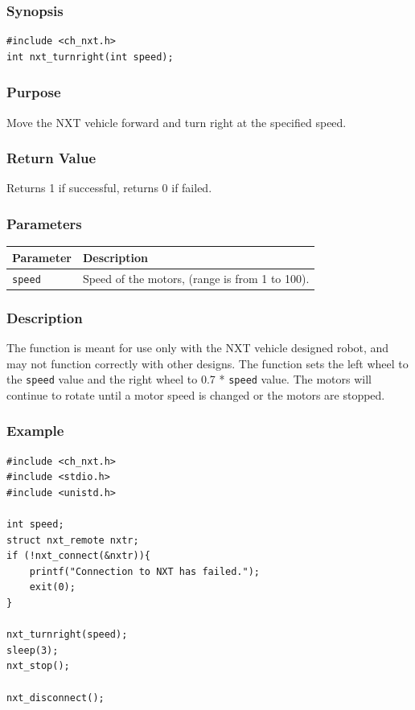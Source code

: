 \documentclass[12pt]{article}
\begin{document}
\subsubsection*{Synopsis}
\begin{verbatim}
#include <ch_nxt.h>
int nxt_turnright(int speed);
\end{verbatim}

\subsubsection*{Purpose}
Move the NXT vehicle forward and turn right at the specified speed.

\subsubsection*{Return Value}
Returns 1 if successful, returns 0 if failed.

\subsubsection*{Parameters}
\begin{tabular}{ l | p{12cm} }
Parameter			& Description\\ \hline
\verb+speed+	    & Speed of the motors, (range is from 1 to 100).
\end{tabular}

\subsubsection*{Description}
The function is meant for use only with the NXT vehicle designed robot, 
and may not function correctly with other designs. The function sets the 
left wheel to the \verb+speed+ value and the right wheel to 0.7 * 
\verb+speed+ value. The motors will continue to rotate until a motor speed 
is changed or the motors are stopped.


\subsubsection*{Example}
\begin{verbatim}
#include <ch_nxt.h> 
#include <stdio.h>
#include <unistd.h>

int speed;
struct nxt_remote nxtr;
if (!nxt_connect(&nxtr)){
    printf("Connection to NXT has failed.");
    exit(0);
}
    
nxt_turnright(speed);
sleep(3);
nxt_stop();

nxt_disconnect();
\end{verbatim}
\end{document}

